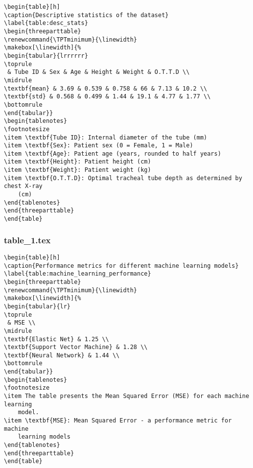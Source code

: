 \documentclass[11pt]{article}
\begin{document}
\begin{Verbatim}[tabsize=4]
\begin{table}[h]
\caption{Descriptive statistics of the dataset}
\label{table:desc_stats}
\begin{threeparttable}
\renewcommand{\TPTminimum}{\linewidth}
\makebox[\linewidth]{%
\begin{tabular}{lrrrrrr}
\toprule
 & Tube ID & Sex & Age & Height & Weight & O.T.T.D \\
\midrule
\textbf{mean} & 3.69 & 0.539 & 0.758 & 66 & 7.13 & 10.2 \\
\textbf{std} & 0.568 & 0.499 & 1.44 & 19.1 & 4.77 & 1.77 \\
\bottomrule
\end{tabular}}
\begin{tablenotes}
\footnotesize
\item \textbf{Tube ID}: Internal diameter of the tube (mm)
\item \textbf{Sex}: Patient sex (0 = Female, 1 = Male)
\item \textbf{Age}: Patient age (years, rounded to half years)
\item \textbf{Height}: Patient height (cm)
\item \textbf{Weight}: Patient weight (kg)
\item \textbf{O.T.T.D}: Optimal tracheal tube depth as determined by chest X-ray
	(cm)
\end{tablenotes}
\end{threeparttable}
\end{table}

\end{Verbatim}

\subsubsection*{table\_1.tex}

\begin{Verbatim}[tabsize=4]
\begin{table}[h]
\caption{Performance metrics for different machine learning models}
\label{table:machine_learning_performance}
\begin{threeparttable}
\renewcommand{\TPTminimum}{\linewidth}
\makebox[\linewidth]{%
\begin{tabular}{lr}
\toprule
 & MSE \\
\midrule
\textbf{Elastic Net} & 1.25 \\
\textbf{Support Vector Machine} & 1.28 \\
\textbf{Neural Network} & 1.44 \\
\bottomrule
\end{tabular}}
\begin{tablenotes}
\footnotesize
\item The table presents the Mean Squared Error (MSE) for each machine learning
	model.
\item \textbf{MSE}: Mean Squared Error - a performance metric for machine
	learning models
\end{tablenotes}
\end{threeparttable}
\end{table}

\end{Verbatim}
\end{document}
